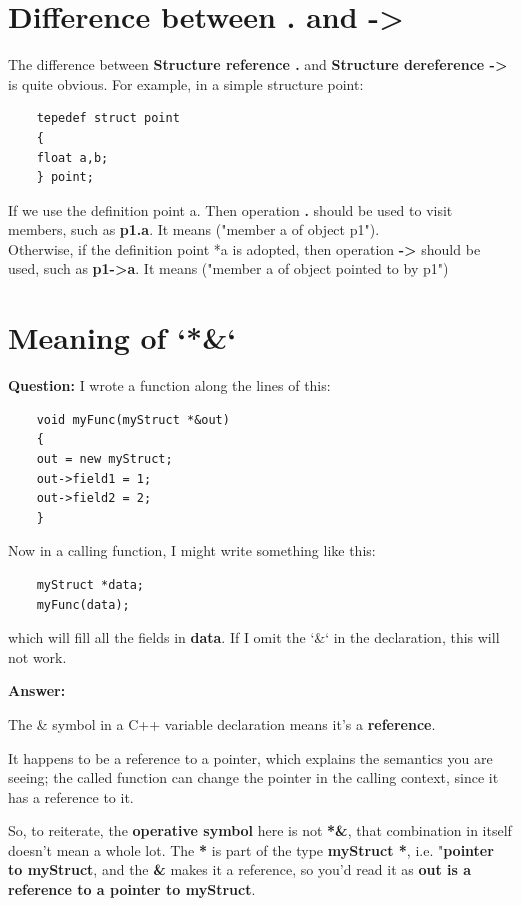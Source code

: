 	
	\section{Difference between . and -\textgreater} 
	The difference between \textbf{Structure reference .} and \textbf{Structure dereference -\textgreater} is quite obvious. For example, in a simple structure point:
	\begin{verbatim}
	tepedef struct point
	{
	float a,b;
	} point;
	\end{verbatim}
	
	If we use the definition point a. Then operation \textbf{.} should be used to visit members, such as \textbf{p1.a}. It means ("member a of object p1").\\
	
	Otherwise, if the definition point *a is adopted, then operation \textbf{-\textgreater} should be used, such as \textbf{p1-\textgreater a}. It means ("member a of object pointed to by p1")
	
	
	\section{Meaning of `*\&`}
	\textbf{Question:}
	I wrote a function along the lines of this:
	
	\begin{verbatim}
	void myFunc(myStruct *&out)
	{
	out = new myStruct;
	out->field1 = 1;
	out->field2 = 2;
	}
	\end{verbatim}
	
	Now in a calling function, I might write something like this:
	
	\begin{verbatim}
	myStruct *data;
	myFunc(data);
	\end{verbatim}
	
	which will fill all the fields in \textbf{data}. If I omit the `\&` in the declaration, this will not work.
	
	\textbf{Answer:}
	
	The \& symbol in a C++ variable declaration means it's a \textbf{reference}.
	
	It happens to be a reference to a pointer, which explains the semantics you are seeing; the called function can change the pointer in the calling context, since it has a reference to it.
	
	So, to reiterate, the \textbf{operative symbol} here is not \textbf{*\&}, that combination in itself doesn't mean a whole lot. The \textbf{*} is part of the type \textbf{myStruct *}, i.e. "\textbf{pointer to myStruct}, and the \textbf{\&} makes it a reference, so you'd read it as \textbf{out is a reference to a pointer to myStruct}.
	
